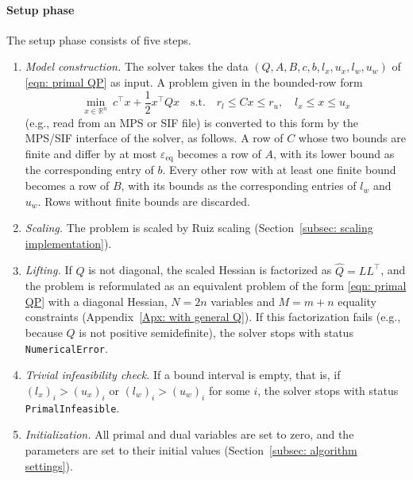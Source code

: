 \paragraph{Setup phase} The setup phase consists of five steps.
\begin{enumerate}
    \item \emph{Model construction.} The solver takes the data $(Q,A,B,c,b,l_x,u_x,l_w,u_w)$ of \eqref{eqn: primal QP} as input. A problem given in the bounded-row form
    \[
        \min_{x \in \mathbb{R}^n}\ c^\top x + \frac{1}{2} x^\top Q x \quad \text{s.t.} \quad r_l \le Cx \le r_u, \quad l_x \le x \le u_x
    \]
    (e.g., read from an MPS or SIF file) is converted to this form by the MPS/SIF interface of the solver, as follows. A row of $C$ whose two bounds are finite and differ by at most $\varepsilon_{\mathrm{eq}}$ becomes a row of $A$, with its lower bound as the corresponding entry of $b$. Every other row with at least one finite bound becomes a row of $B$, with its bounds as the corresponding entries of $l_w$ and $u_w$. Rows without finite bounds are discarded.
    \item \emph{Scaling.} The problem is scaled by Ruiz scaling (Section~\ref{subsec: scaling implementation}).
    \item \emph{Lifting.} If $Q$ is not diagonal, the scaled Hessian is factorized as $\hat{Q} = LL^\top$, and the problem is reformulated as an equivalent problem of the form \eqref{eqn: primal QP} with a diagonal Hessian, $N = 2n$ variables and $M = m+n$ equality constraints (Appendix~\ref{Apx: with general Q}). If this factorization fails (e.g., because $Q$ is not positive semidefinite), the solver stops with status \texttt{NumericalError}.
    \item \emph{Trivial infeasibility check.} If a bound interval is empty, that is, if $(l_x)_i > (u_x)_i$ or $(l_w)_i > (u_w)_i$ for some $i$, the solver stops with status \texttt{PrimalInfeasible}.
    \item \emph{Initialization.} All primal and dual variables are set to zero, and the parameters are set to their initial values (Section~\ref{subsec: algorithm settings}).
\end{enumerate}

